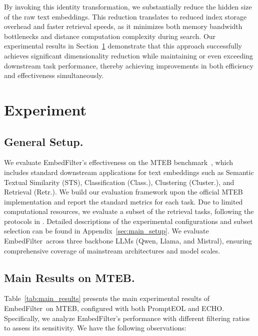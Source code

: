 \documentclass[sigconf]{acmart}
\newcommand{\name}{EmbedFilter}
\begin{document}
By invoking this identity transformation, we substantially reduce the hidden size of the raw text embeddings. 
This reduction translates to reduced index storage overhead and faster retrieval speeds, as it minimizes both memory bandwidth bottlenecks and distance computation complexity during search. 
Our experimental results in Section~\ref{sec:exp} demonstrate that this approach successfully achieves significant dimensionality reduction while maintaining or even exceeding downstream task performance, thereby achieving improvements in both efficiency and effectiveness simultaneously.



\section{Experiment}
\label{sec:exp}
\subsection{General Setup.}
We evaluate \name's effectiveness on the MTEB benchmark~\cite{mteb}, which includes standard downstream applications for text embeddings such as Semantic Textual Similarity (STS), Classification (Class.), Clustering (Cluster.), and Retrieval (Retr.).
We build our evaluation framework upon the official MTEB implementation and report the standard metrics for each task.
Due to limited computational resources, we evaluate a subset of the retrieval tasks, following the protocols in \cite{llm2vec, moee}.
Detailed descriptions of the experimental configurations and subset selection can be found in Appendix~\ref{sec:main_setup}.
We evaluate \name\ across three backbone LLMs (Qwen, Llama, and Mistral), ensuring comprehensive coverage of mainstream architectures and model scales.


\subsection{Main Results on MTEB.}
Table~\ref{tab:main_results} presents the main experimental results of \name\ on MTEB, configured with both PromptEOL and ECHO.
Specifically, we analyze \name's performance with different filtering ratios to assess its sensitivity.
We have the following observations:
\end{document}
